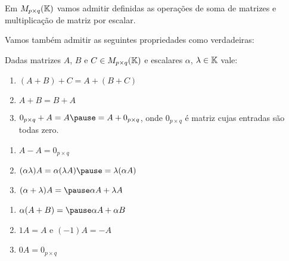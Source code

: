 \documentclass{beamer}
\begin{document}
    \begin{frame}
        Em $M_{p\times q}(\mathbb{K})$ vamos admitir definidas as operações de soma de matrizes \pause e multiplicação de matriz por escalar.\pause

        Vamos também admitir as seguintes propriedades como verdadeiras:\pause
        \begin{proposicao}
            Dadas matrizes $A$, $B$ e $C \in M_{p\times q}(\mathbb{K})$ \pause e escalares $\alpha$, $\lambda \in \mathbb{K}$ vale:\pause
            \begin{enumerate}[label={\roman*})]
                \item $(A + B) + C = A + (B + C)$\pause
                \item $A + B = B + A$\pause
                \item $0_{p \times q} + A = A \pause = A + 0_{p \times q}$, \pause onde $0_{p \times q}$ é matriz cujas entradas são todas zero.\pause
                \seti
            \end{enumerate}
        \end{proposicao}
    \end{frame}

    \begin{frame}
        \begin{proposicao}
            \begin{enumerate}[label={\roman*})]
                \conti
                \item $A - A = 0_{p \times q}$\pause
                \item $(\alpha\lambda) A = \alpha(\lambda A) \pause = \lambda(\alpha A)$\pause
                \item $(\alpha + \lambda)A = \pause \alpha A + \lambda A$
                \seti
            \end{enumerate}
        \end{proposicao}
    \end{frame}

    \begin{frame}
        \begin{proposicao}
            \begin{enumerate}[label={\roman*})]
                \conti
                \item $\alpha(A + B) = \pause \alpha A + \alpha B$\pause
                \item $1A = A$ e $(-1)A = -A$\pause
                \item  $0A = 0_{p \times q}$
            \end{enumerate}
        \end{proposicao}
    \end{frame}
\end{document}
